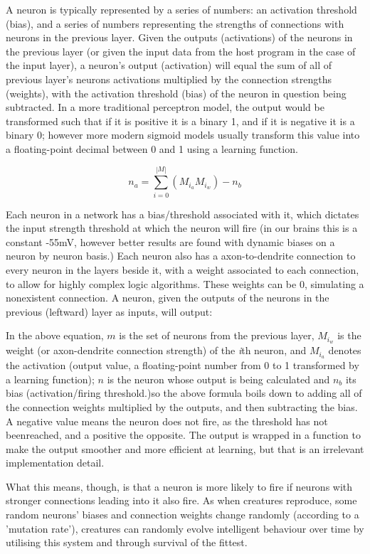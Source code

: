 \documentclass[]{report}
\begin{document}
A neuron is typically represented by a series of numbers: an activation threshold (bias), and a series of numbers representing the strengths of connections with neurons in the previous layer. Given the outputs (activations) of the neurons in the previous layer (or given the input data from the host program in the case of the input layer), a neuron's output (activation) will equal the sum of all of previous layer's neurons activations multiplied by the connection strengths (weights), with the activation threshold (bias) of the neuron in question being subtracted. In a more traditional perceptron model, the output would be transformed such that if it is positive it is a binary 1, and if it is negative it is a binary 0; however more modern sigmoid models usually transform this value into a floating-point decimal between 0 and 1 using a learning function.

\begin{equation}
n_a = \sum_{i=0}^{|M|}(M_{i_a} M_{i_w}) - n_b
\end{equation}

Each neuron in a network has a bias/threshold associated with it, which dictates the input strength threshold at which the neuron will fire (in our brains this is a constant -55mV, however better results are found with dynamic biases on a neuron by neuron basis.) Each neuron also has a axon-to-dendrite connection to every neuron in the layers beside it, with a weight associated to each connection, to allow for highly complex logic algorithms. These weights can be 0, simulating a nonexistent connection. A neuron, given the outputs of the neurons in the previous (leftward) layer as inputs, will output:

In the above equation, \(m\) is the set of neurons from the previous layer, \(M_{i_w}\) is the weight (or axon-dendrite connection strength) of the \emph{i}th neuron, and \(M_{i_a}\) denotes the activation (output value, a floating-point number from 0 to 1 transformed by a learning function); \(n\) is the neuron whose output is being calculated and \(n_b\) its bias (activation/firing threshold.)so the above formula boils down to adding all of the connection weights multiplied by the outputs, and then subtracting the bias. A negative value means the neuron does not fire, as the threshold has not beenreached, and a positive the opposite. The output is wrapped in a function to make the output smoother and more efficient at learning, but that is an irrelevant implementation detail.

What this means, though, is that a neuron is more likely to fire if neurons with stronger connections leading into it also fire. As when creatures reproduce, some random neurons' biases and connection weights change randomly (according to a 'mutation rate'), creatures can randomly evolve intelligent behaviour over time by utilising this system and through survival of the fittest.
\end{document}
